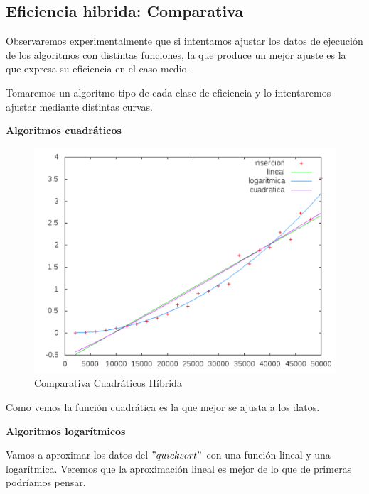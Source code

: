 \documentclass[a4paper, 11pt]{article}
\begin{document}
\subsection{Eficiencia hibrida: Comparativa}

Observaremos experimentalmente que si intentamos ajustar los datos de ejecución de los algoritmos con distintas funciones, la que produce un mejor ajuste es la que expresa su eficiencia en el caso medio.

Tomaremos un algoritmo tipo de cada clase de eficiencia y lo intentaremos ajustar mediante distintas curvas.

\vspace{1cm}
\textbf{Algoritmos cuadráticos}

\begin{figure}[h]\includegraphics[width=13cm]{img/cuad_hibrida.pdf} \centering
	\caption{Comparativa Cuadráticos Híbrida}\end{figure}

Como vemos la función cuadrática es la que mejor se ajusta a los datos.

\vspace{1cm}

\textbf{Algoritmos logarítmicos}

Vamos a aproximar los datos del $"quicksort"$ con una función lineal y una logarítmica. Veremos que la aproximación lineal es mejor de lo que de primeras podríamos pensar.
\end{document}

